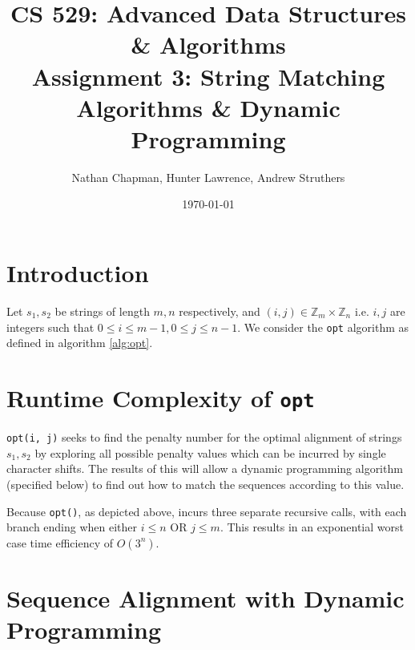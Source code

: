 \documentclass{article}
\title{\vspace*{-0.625in}CS 529: Advanced Data Structures \& Algorithms \\ Assignment 3: String Matching Algorithms \& Dynamic Programming}
\author{Nathan Chapman, Hunter Lawrence, Andrew Struthers}
\date{\today}
\renewcommand{\_}{\ifincsname_\else\legacyunderscore\fi}
\newcommand{\integer}{\textbf{int} }
\begin{document}
    \maketitle

    \section*{Introduction}

        Let $s_1, s_2$ be strings of length $m, n$ respectively, and $(i, j) \in \mathbb{Z}_m \times \mathbb{Z}_n$ i.e. $i, j$ are integers such that $0 \leq i \leq m - 1, 0 \leq j \leq n - 1$.  We consider the \texttt{opt} algorithm as defined in algorithm \ref{alg:opt}.

        \begin{function}
            \DontPrintSemicolon
            \caption{opt(\integer $i$, \integer $j$)}
            \label{alg:opt}
            
        \end{function}

    \section*{Runtime Complexity of \texttt{opt}}

    \texttt{opt(i, j)} seeks to find the penalty number for the optimal alignment of strings $s_1, s_2$ by exploring all possible penalty values which can be incurred by single character shifts. The results of this will allow a dynamic programming algorithm (specified below) to find out how to match the sequences according to this value.

    Because \texttt{opt()}, as depicted above, incurs three separate recursive calls, with each branch ending when either $i \leq  n $ OR $ j \leq m$. This results in an exponential worst case time efficiency of $O(3^n)$.
    
\pagebreak
    \section*{Sequence Alignment with Dynamic Programming}
\end{document}
